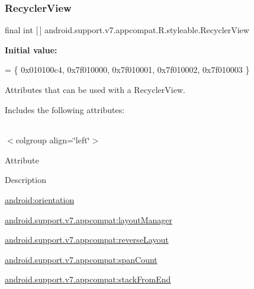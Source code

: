 \subsubsection{\texorpdfstring{Recycler\+View}{RecyclerView}}
{\footnotesize\ttfamily final int \mbox{[}$\,$\mbox{]} android.\+support.\+v7.\+appcompat.\+R.\+styleable.\+Recycler\+View\hspace{0.3cm}{\ttfamily [static]}}

{\bfseries Initial value\+:}
\begin{DoxyCode}
= \{
            0x010100c4, 0x7f010000, 0x7f010001, 0x7f010002,
            0x7f010003
        \}
\end{DoxyCode}
Attributes that can be used with a Recycler\+View. 

Includes the following attributes\+:

\tabulinesep=1mm
\begin{longtabu} spread 0pt [c]{*{0}{|X[-1]}|}
\hline
\end{longtabu}
$<$colgroup align=\char`\"{}left\char`\"{}$>$ 

Attribute

Description 

{\ttfamily \hyperlink{classandroid_1_1support_1_1v7_1_1appcompat_1_1R_1_1styleable_a203273169e4530ae4345acb488aad891}{android\+:orientation}}

{\ttfamily \hyperlink{classandroid_1_1support_1_1v7_1_1appcompat_1_1R_1_1styleable_a4b3b3e33e1530975bdb28a270da14701}{android.\+support.\+v7.\+appcompat\+:layout\+Manager}}

{\ttfamily \hyperlink{classandroid_1_1support_1_1v7_1_1appcompat_1_1R_1_1styleable_a27340547a2470f70de21cecee86cefb0}{android.\+support.\+v7.\+appcompat\+:reverse\+Layout}}

{\ttfamily \hyperlink{classandroid_1_1support_1_1v7_1_1appcompat_1_1R_1_1styleable_ac99c387843c4ab5e1f26911d0baac306}{android.\+support.\+v7.\+appcompat\+:span\+Count}}

{\ttfamily \hyperlink{classandroid_1_1support_1_1v7_1_1appcompat_1_1R_1_1styleable_af2042a32a5c4358617f057338c016568}{android.\+support.\+v7.\+appcompat\+:stack\+From\+End}}

